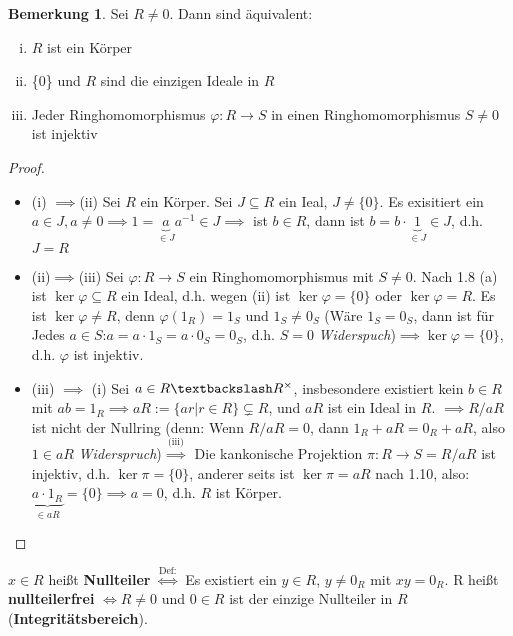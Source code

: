 \documentclass[a4paper, titlepage]{article}
\theoremstyle{definition}
\newtheorem{bem}[satz]{Bemerkung}
\begin{document}
\begin{bem}
Sei $R\neq 0$. Dann sind äquivalent:
\begin{enumerate}[(i)]
	\item $R$ ist ein Körper 
	\item \{0\} und $R$ sind die einzigen Ideale in $R$ 
	\item Jeder Ringhomomorphismus $\varphi: R \longrightarrow S$ in einen Ringhomomorphismus $S\neq 0$ ist injektiv
\end{enumerate}
\end{bem}
\begin{proof}
	\begin{itemize}
		\item (i) $\implies $(ii) Sei $R$ ein Körper. Sei $J\subseteq R$ ein Ieal, $J\neq \{0\}$. Es exisitiert ein $a\in J, a\neq 0\implies 1=\underbrace{a}_{\in J}a^{-1}\in J\implies $ ist 	$b\in R$, dann ist $b=b \cdot \underbrace{1}_{\in J}\in J$, d.h.  $J=R$
		\item (ii)$\implies$(iii) Sei $\varphi: R \longrightarrow S$ ein Ringhomomorphismus mit $S\neq 0$. Nach 1.8 (a) ist $\operatorname{ker}\varphi\subseteq R$ ein Ideal, d.h. wegen (ii) ist $\operatorname{ker}\varphi=\{0\}$ oder $\operatorname{ker}\varphi = R$.
		Es ist $\operatorname{ker}\varphi\neq R$, denn $\varphi(1_R)=1_S$ und $1_S\neq 0_S$ (Wäre $1_S=0_S$, dann ist für Jedes $a\in S$:$a=a\cdot 1_S=a\cdot 0_S=0_S$, d.h. $S=0$ \textit{Widerspuch})$\implies \operatorname{ker}\varphi=\{0\}$, d.h. $\varphi$ ist injektiv.
		\item (iii) $\implies$ (i) Sei $a\in R\textbackslash R^{\times}$, insbesondere existiert kein $b\in R$ mit $ab=1_R\implies aR:=\{ar|r\in R\}\subsetneq R$, und $aR$ ist ein Ideal in $R$.
		$\implies R/aR$ ist nicht der Nullring (denn: Wenn $R/aR=0$, dann $1_R+aR=0_R+aR$, also $1\in aR$ \textit{Widerspruch})$\overset{\text{(iii)}}{\implies}$ Die kankonische Projektion $\pi: R \longrightarrow S=R/aR$ ist injektiv, d.h. $\operatorname{ker}\pi = \{0\}$, anderer seits ist $\operatorname{ker}\pi=aR$ nach 1.10, also: $\underbrace{a\cdot 1_R}_{\in aR}=\{0\}\implies a=0$, d.h. $R$ ist Körper.
	\end{itemize}
\end{proof}
\begin{definition} 
	$x\in R$ heißt \textbf{Nullteiler} $\overset{\text{Def:}}{\Leftrightarrow}$ Es existiert ein $y\in R$, $y\neq 0_R$ mit $xy=0_R$.
	R heißt \textbf{nullteilerfrei} $\Leftrightarrow R\neq 0$ und $0\in R$ ist der einzige Nullteiler in $R$ (\textbf{Integritätsbereich}).
\end{definition}
\end{document}
